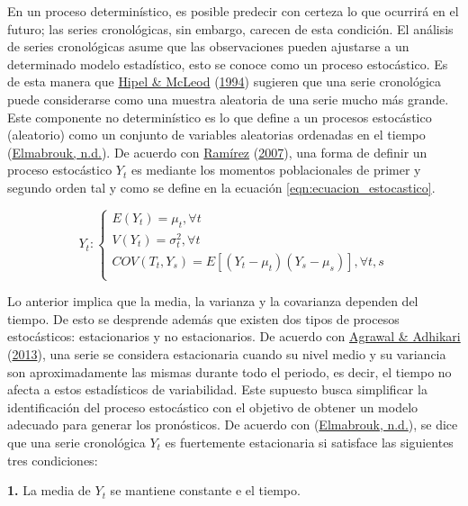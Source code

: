 \documentclass[
]{article}
\begin{document}
En un proceso determinístico, es posible predecir con certeza lo que
ocurrirá en el futuro; las series cronológicas, sin embargo, carecen de
esta condición. El análisis de series cronológicas asume que las
observaciones pueden ajustarse a un determinado modelo estadístico, esto
se conoce como un proceso estocástico. Es de esta manera que
\protect\hyperlink{ref-Hipel}{Hipel \& McLeod}
(\protect\hyperlink{ref-Hipel}{1994}) sugieren que una serie cronológica
puede considerarse como una muestra aleatoria de una serie mucho más
grande. Este componente no determinístico es lo que define a un procesos
estocástico (aleatorio) como un conjunto de variables aleatorias
ordenadas en el tiempo
(\protect\hyperlink{ref-definicion_estocastico}{Elmabrouk, n.d.}). De
acuerdo con \protect\hyperlink{ref-introduccion_series}{Ramírez}
(\protect\hyperlink{ref-introduccion_series}{2007}), una forma de
definir un proceso estocástico \(Y_t\) es mediante los momentos
poblacionales de primer y segundo orden tal y como se define en la
ecuación \ref{eqn:ecuacion_estocastico}.

\begin{equation}
\label{eqn:ecuacion_estocastico}
Y_t:
\begin{cases}
E(Y_t) = \mu_t, \forall t \\
V(Y_t) = \sigma^2_t, \forall t \\
COV(T_t,Y_s) = E\left[(Y_t-\mu_t)(Y_s-\mu_s)\right], \forall t,s \\
\end{cases}
\end{equation}

Lo anterior implica que la media, la varianza y la covarianza dependen
del tiempo. De esto se desprende además que existen dos tipos de
procesos estocásticos: estacionarios y no estacionarios. De acuerdo con
\protect\hyperlink{ref-stationary_def}{Agrawal \& Adhikari}
(\protect\hyperlink{ref-stationary_def}{2013}), una serie se considera
estacionaria cuando su nivel medio y su variancia son aproximadamente
las mismas durante todo el periodo, es decir, el tiempo no afecta a
estos estadísticos de variabilidad. Este supuesto busca simplificar la
identificación del proceso estocástico con el objetivo de obtener un
modelo adecuado para generar los pronósticos. De acuerdo con
(\protect\hyperlink{ref-definicion_estocastico}{Elmabrouk, n.d.}), se
dice que una serie cronológica \(Y_t\) es fuertemente estacionaria si
satisface las siguientes tres condiciones:

\textbf{1.} La media de \(Y_t\) se mantiene constante e el tiempo.
\end{document}
